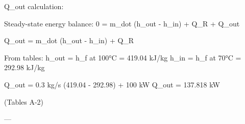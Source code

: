 Q_out calculation:  

Steady-state energy balance:  
0 = m_dot (h_out - h_in) + Q_R + Q_out  

Q_out = m_dot (h_out - h_in) + Q_R  

From tables:  
h_out = h_f at 100°C = 419.04 kJ/kg  
h_in = h_f at 70°C = 292.98 kJ/kg  

Q_out = 0.3 kg/s (419.04 - 292.98) + 100 kW  
Q_out = 137.818 kW  

(Tables A-2)  

---
